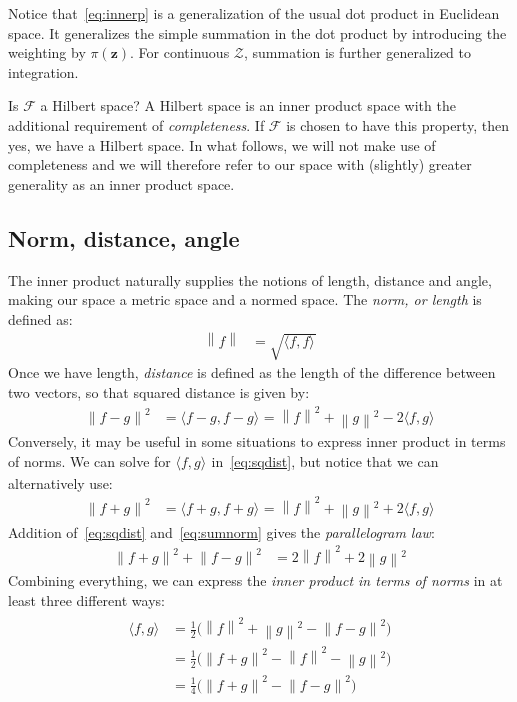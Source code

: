 \documentclass[a4paper,oneside,12pt,english]{report}
\def\zvec{\mathbf{z}}
\DeclareMathOperator{\abs}{abs}
\def\expv#1#2{\bigl\langle#1\bigr\rangle_{#2}}
\def\Zset{\mathcal{Z}}
\def\Zset{\mathcal{Z}}
\def\Fset{\mathcal{F}}
\def\dot#1#2{\expv{#1,#2}{}}
\begin{document}
Notice that~\eqref{eq:innerp} is a generalization of the usual dot product in Euclidean space. It generalizes the simple summation in the dot product by introducing the weighting by $\pi(\zvec)$. For continuous $\Zset$, summation is further generalized to integration.
 
Is $\Fset$ a Hilbert space? A Hilbert space is an inner product space with the additional requirement of \emph{completeness}. If $\Fset$ is chosen to have this property, then yes, we have a Hilbert space. In what follows, we will not make use of completeness and we will therefore refer to our space with (slightly) greater generality as an inner product space.

\subsection{Norm, distance, angle}
\def\norm#1{\left\lVert#1\right\rVert}
\def\abs#1{\left\lvert#1\right\rvert}
The inner product naturally supplies the notions of length, distance and angle, making our space a metric space and a normed space. The \emph{norm, or length} is defined as:
\begin{align}
\norm{f} &= \sqrt{\dot{f}{f}}
\end{align}
Once we have length, \emph{distance} is defined as the length of the difference between two vectors, so that squared distance is given by:
\begin{align}
\label{eq:sqdist}
\norm{f-g}^2 &= \dot{f-g}{f-g} = \norm{f}^2 +\norm{g}^2 -2\dot{f}{g}
\end{align}
Conversely, it may be useful in some situations to express inner product in terms of norms. We can solve for $\dot{f}{g}$ in~\eqref{eq:sqdist}, but notice that we can alternatively use:
\begin{align}
\label{eq:sumnorm}
\norm{f+g}^2 &= \dot{f+g}{f+g} = \norm{f}^2 +\norm{g}^2 +2\dot{f}{g}
\end{align}
Addition of~\eqref{eq:sqdist} and~\eqref{eq:sumnorm} gives the \emph{parallelogram law}:
\begin{align}
\label{eq:parlaw}
\norm{f+g}^2 + \norm{f-g}^2&= 2\norm{f}^2 +2\norm{g}^2
\end{align}
Combining everything, we can express the \emph{inner product in terms of norms} in at least three different ways:
\begin{align}
\label{eq:dotvianorms}
\begin{split}
\dot{f}{g} &= \frac12\bigl(\norm{f}^2+\norm{g}^2 - \norm{f-g}^2\bigr) \\
&= \frac12\bigl(\norm{f+g}^2 - \norm{f}^2- \norm{g}^2\bigr)  \\
&= \frac14\bigl(\norm{f+g}^2-\norm{f-g}^2\bigr)
\end{split}
\end{align}
\end{document}
